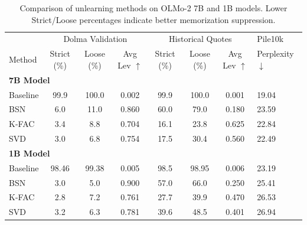 \documentclass{article} %
\begin{document}
\begin{table}[t]
\centering
\small
\begin{tabular}{lccccccl}
\hline
         & \multicolumn{3}{c}{Dolma Validation}          & \multicolumn{3}{c}{Historical Quotes}         & Pile10k    \\
Method   & Strict (\%) & Loose (\%) & Avg Lev $\uparrow$ & Strict (\%) & Loose (\%) & Avg Lev $\uparrow$ & Perplexity $\downarrow$ \\ \hline
\multicolumn{8}{l}{\textbf{7B Model}} \\ \hline
Baseline & 99.9        & 100.0      & 0.002              & 99.9        & 100.0      & 0.001              & 19.04      \\
BSN      & 6.0         & 11.0       & 0.860              & 60.0        & 79.0       & 0.180              & 23.59      \\
K-FAC    & 3.4         & 8.8        & 0.704              & 16.1        & 23.8       & 0.625              & 22.84      \\
SVD      & 3.0         & 6.8        & 0.754              & 17.5        & 30.4       & 0.560              & 22.49      \\ \hline\hline
\multicolumn{8}{l}{\textbf{1B Model}} \\ \hline
Baseline & 98.46       & 99.38      & 0.005              & 98.5        & 98.95      & 0.006              & 23.19      \\
BSN      & 3.0         & 5.0        & 0.900              & 57.0        & 66.0       & 0.250              & 25.41      \\
K-FAC    & 2.8         & 7.2        & 0.761              & 27.7        & 39.9       & 0.470              & 26.53         \\
SVD      & 3.2         & 6.3        & 0.781              & 39.6        & 48.5       & 0.401              & 26.94      \\ \hline
\end{tabular}
\caption{Comparison of unlearning methods on OLMo-2 7B and 1B models. Lower Strict/Loose percentages indicate better memorization suppression. }
\label{tab:results_memorization}
\vspace{-0.5em}
\end{table}
\end{document}
